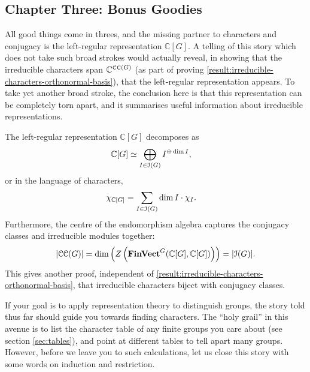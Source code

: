 \subsection{Chapter Three: Bonus Goodies} %
\par All good things come in threes, and the missing partner to characters and conjugacy is the left-regular representation $\mathbb{C}[G]$. A telling of this story which does not take such broad strokes would actually reveal, in showing that the irreducible characters span $\mathbb{C}^{\operatorname{\mathcal{CC}}(G)}$ (as part of proving \ref{result:irreducible-characters-orthonormal-basis}), that the left-regular representation appears. To take yet another broad stroke, the conclusion here is that this representation can be completely torn apart, and it summarises useful information about irreducible representations.
\begin{proposition}
\label{result:kill-left-regular}
  \pan The left-regular representation $\mathbb{C}[G]$ decomposes as
  \begin{align*}
    \mathbb{C}[G]
    &\simeq \bigoplus_{I \in \operatorname{\mathcal{I}}(G)} I^{\oplus \dim I}
    ,
  \end{align*}
  or in the language of characters,
  \begin{align*}
    \chi_{\mathbb{C}[G]}
    &= \sum_{I \in \operatorname{\mathcal{I}}(G)} \dim I \cdot \chi_I
    .
  \end{align*}
  \pan Furthermore, the centre of the endomorphism algebra captures the conjugacy classes and irreducible modules together:
  \begin{align*}
    \lvert \operatorname{\mathcal{CC}}(G) \rvert
    = \dim\left(
      Z\left(
        \operatorname{\mathbf{FinVect}}^G (\mathbb{C}[G], \mathbb{C}[G])
      \right)
    \right)
    = \lvert \operatorname{\mathcal{I}}(G) \rvert
    .
  \end{align*}
  \pan This gives another proof, independent of \ref{result:irreducible-characters-orthonormal-basis}, that irreducible characters biject with conjugacy classes.
\end{proposition}
\par If your goal is to apply representation theory to distinguish groups, the story told thus far should guide you towards finding characters. The ``holy grail'' in this avenue is to list the character table of any finite groups you care about (see section \ref{sec:tables}), and point at different tables to tell apart many groups. However, before we leave you to such calculations, let us close this story with some words on induction and restriction.
